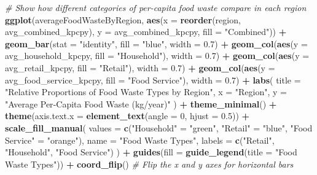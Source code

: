 \documentclass[
]{article}
\newenvironment{Shaded}{\begin{snugshade}}{\end{snugshade}}
\newcommand{\AttributeTok}[1]{\textcolor[rgb]{0.13,0.29,0.53}{#1}}
\newcommand{\CommentTok}[1]{\textcolor[rgb]{0.56,0.35,0.01}{\textit{#1}}}
\newcommand{\DecValTok}[1]{\textcolor[rgb]{0.00,0.00,0.81}{#1}}
\newcommand{\FloatTok}[1]{\textcolor[rgb]{0.00,0.00,0.81}{#1}}
\newcommand{\FunctionTok}[1]{\textcolor[rgb]{0.13,0.29,0.53}{\textbf{#1}}}
\newcommand{\NormalTok}[1]{#1}
\newcommand{\OtherTok}[1]{\textcolor[rgb]{0.56,0.35,0.01}{#1}}
\newcommand{\SpecialCharTok}[1]{\textcolor[rgb]{0.81,0.36,0.00}{\textbf{#1}}}
\newcommand{\StringTok}[1]{\textcolor[rgb]{0.31,0.60,0.02}{#1}}
\begin{document}
\begin{Shaded}
\begin{Highlighting}[]
\CommentTok{\# Show how different categories of per{-}capita food waste compare in each region}
\FunctionTok{ggplot}\NormalTok{(averageFoodWasteByRegion, }\FunctionTok{aes}\NormalTok{(}\AttributeTok{x =} \FunctionTok{reorder}\NormalTok{(region, avg\_combined\_kpcpy), }\AttributeTok{y =}\NormalTok{ avg\_combined\_kpcpy, }\AttributeTok{fill =} \StringTok{"Combined"}\NormalTok{)) }\SpecialCharTok{+}
  \FunctionTok{geom\_bar}\NormalTok{(}\AttributeTok{stat =} \StringTok{"identity"}\NormalTok{, }\AttributeTok{fill =} \StringTok{"blue"}\NormalTok{, }\AttributeTok{width =} \FloatTok{0.7}\NormalTok{) }\SpecialCharTok{+}
  \FunctionTok{geom\_col}\NormalTok{(}\FunctionTok{aes}\NormalTok{(}\AttributeTok{y =}\NormalTok{ avg\_household\_kpcpy, }\AttributeTok{fill =} \StringTok{"Household"}\NormalTok{), }\AttributeTok{width =} \FloatTok{0.7}\NormalTok{) }\SpecialCharTok{+}
  \FunctionTok{geom\_col}\NormalTok{(}\FunctionTok{aes}\NormalTok{(}\AttributeTok{y =}\NormalTok{ avg\_retail\_kpcpy, }\AttributeTok{fill =} \StringTok{"Retail"}\NormalTok{), }\AttributeTok{width =} \FloatTok{0.7}\NormalTok{) }\SpecialCharTok{+}
  \FunctionTok{geom\_col}\NormalTok{(}\FunctionTok{aes}\NormalTok{(}\AttributeTok{y =}\NormalTok{ avg\_food\_service\_kpcpy, }\AttributeTok{fill =} \StringTok{"Food Service"}\NormalTok{), }\AttributeTok{width =} \FloatTok{0.7}\NormalTok{) }\SpecialCharTok{+}
  \FunctionTok{labs}\NormalTok{(}
    \AttributeTok{title =} \StringTok{"Relative Proportions of Food Waste Types by Region"}\NormalTok{,}
    \AttributeTok{x =} \StringTok{"Region"}\NormalTok{,}
    \AttributeTok{y =} \StringTok{"Average Per{-}Capita Food Waste (kg/year)"}
\NormalTok{  ) }\SpecialCharTok{+}
  \FunctionTok{theme\_minimal}\NormalTok{() }\SpecialCharTok{+}
  \FunctionTok{theme}\NormalTok{(}\AttributeTok{axis.text.x =} \FunctionTok{element\_text}\NormalTok{(}\AttributeTok{angle =} \DecValTok{0}\NormalTok{, }\AttributeTok{hjust =} \FloatTok{0.5}\NormalTok{)) }\SpecialCharTok{+}
  \FunctionTok{scale\_fill\_manual}\NormalTok{(}
    \AttributeTok{values =} \FunctionTok{c}\NormalTok{(}\StringTok{"Household"} \OtherTok{=} \StringTok{"green"}\NormalTok{, }\StringTok{"Retail"} \OtherTok{=} \StringTok{"blue"}\NormalTok{, }\StringTok{"Food Service"} \OtherTok{=} \StringTok{"orange"}\NormalTok{),}
    \AttributeTok{name =} \StringTok{"Food Waste Types"}\NormalTok{,}
    \AttributeTok{labels =} \FunctionTok{c}\NormalTok{(}\StringTok{"Retail"}\NormalTok{, }\StringTok{"Household"}\NormalTok{, }\StringTok{"Food Service"}\NormalTok{)}
\NormalTok{  ) }\SpecialCharTok{+}
  \FunctionTok{guides}\NormalTok{(}\AttributeTok{fill =} \FunctionTok{guide\_legend}\NormalTok{(}\AttributeTok{title =} \StringTok{"Food Waste Types"}\NormalTok{)) }\SpecialCharTok{+}
  \FunctionTok{coord\_flip}\NormalTok{()  }\CommentTok{\# Flip the x and y axes for horizontal bars}
\end{Highlighting}
\end{Shaded}
\end{document}
